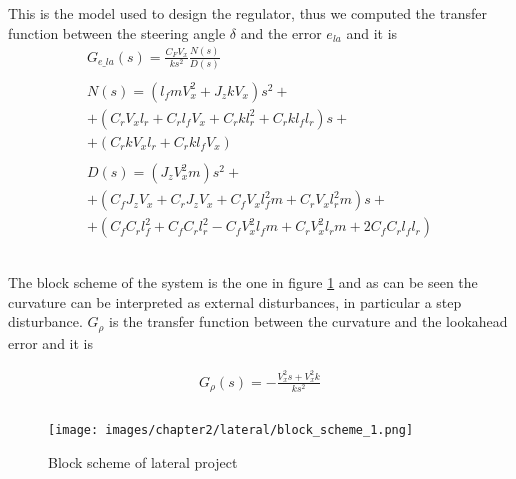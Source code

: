\documentclass{report}
\begin{document}
This is the model used to design the regulator, thus we computed the transfer function between the steering angle $\delta$ and the error $e_{la}$ and it is
\begin{equation}
\begin{aligned}
G_{e\_la}(s) = \frac{C_F V_x}{k s^2} \frac{N(s)}{D(s)}\\\\
N(s) = (l_f m V_x^2 + J_z k V_x)s^2 + \\ + (C_r V_x l_r + C_r l_f V_x + C_r k l_r^2 + C_r k l_f l_r)s + \\ + (C_r k V_x l_r + C_r k l_f V_x)\\\\
D(s) = (J_z V_x^2 m)s^2 + \\ + (C_f J_z V_x + C_r J_z V_x + C_f V_x l_f^2 m + C_r V_x l_r^2 m)s + \\ + (C_f C_r l_f^2 + C_f C_r l_r^2 - C_f V_x^2 l_f m + C_r V_x^2 l_r m + 2 C_f C_r l_f l_r)\\\\\\
\end{aligned}    
\end{equation}

The block scheme of the system is the one in figure \ref{fig:latController_blockscheme1} and as can be seen the curvature can be interpreted as external disturbances, in particular a step disturbance. $G_\rho$ is the transfer function between the curvature and the lookahead error and it is

\begin{equation}
\begin{aligned}
G_{\rho}(s) = -\frac{V_x^2 s + V_x^2 k}{k s^2}\\\\
\end{aligned}    
\end{equation}


\begin{figure}[h!]
    \centering
    \texttt{[image: images/chapter2/lateral/block\_scheme\_1.png]}
    \caption{Block scheme of lateral project}
    \label{fig:latController_blockscheme1}
\end{figure}
\end{document}
